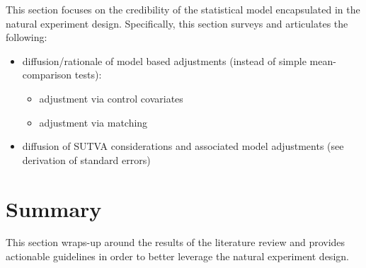 \documentclass[nobib]{tufte-handout}
\begin{document}
\begin{refsection}
\noindent This section focuses on the credibility of the statistical model
encapsulated in the natural experiment design. Specifically, this section surveys and articulates the following:

\begin{itemize}
    \item diffusion/rationale of model based adjustments (instead of simple
        mean-comparison tests):
        \begin{itemize}
            \item adjustment via control covariates
            \item adjustment via matching
        \end{itemize}
    \item diffusion of SUTVA considerations and associated model adjustments
        (see derivation of standard errors)
\end{itemize}


%
%
%
%
%
%
%
%
%
%
%
%

\section{Summary}

\noindent This section wraps-up around the results of the literature review and
provides actionable guidelines in order to better leverage the natural
experiment design.



\end{refsection}
\end{document}
